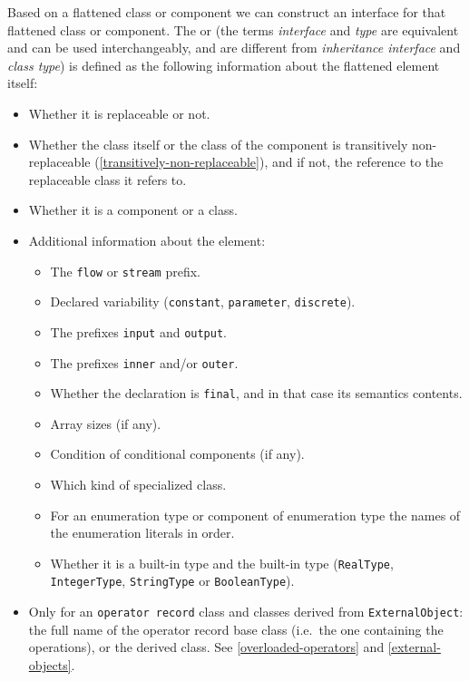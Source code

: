 Based on a flattened class or component we can construct an interface for that flattened class or component.
The  or  (the terms \emph{interface} and \emph{type} are equivalent and can be used interchangeably, and are different from \emph{inheritance interface} and \emph{class type}) is defined as the following information about the flattened element itself:
\begin{itemize}
\item
  Whether it is replaceable or not.
\item
  Whether the class itself or the class of the component is transitively
  non-replaceable (\cref{transitively-non-replaceable}), and if not, the reference to the
  replaceable class it refers to.
\item
  Whether it is a component or a class.
\item
  Additional information about the element:
  \begin{itemize}
  \item
    The \lstinline!flow! or \lstinline!stream! prefix.
  \item
    Declared variability (\lstinline!constant!, \lstinline!parameter!, \lstinline!discrete!).
  \item
    The prefixes \lstinline!input! and \lstinline!output!.
  \item
    The prefixes \lstinline!inner! and/or \lstinline!outer!.
  \item
    Whether the declaration is \lstinline!final!, and in that case its semantics
    contents.
  \item
    Array sizes (if any).
  \item
    Condition of conditional components (if any).
  \item
    Which kind of specialized class.
  \item
    For an enumeration type or component of enumeration type the names
    of the enumeration literals in order.
  \item
    Whether it is a built-in type and the built-in type (\lstinline!RealType!,
    \lstinline!IntegerType!, \lstinline!StringType! or \lstinline!BooleanType!).
  \end{itemize}
\item
  Only for an \lstinline!operator record! class and classes derived from \lstinline!ExternalObject!: the full name of the operator record base class (i.e.\ the one containing the operations), or the derived class.
  See \cref{overloaded-operators} and \cref{external-objects}.


\end{itemize}

